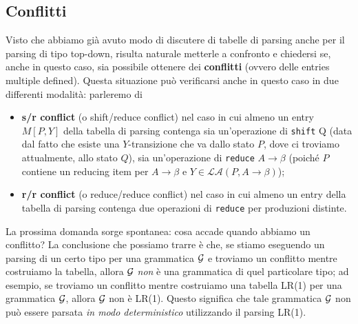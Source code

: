 \documentclass[class=book, crop=false, oneside, 12pt]{standalone}
\begin{document}
\subsection{Conflitti}
Visto che abbiamo già avuto modo di discutere di tabelle di parsing anche per il parsing di tipo top-down, risulta naturale metterle a confronto e chiedersi se, anche in questo caso, sia possibile ottenere dei \textbf{conflitti} (ovvero delle entries multiple defined). Questa situazione può verificarsi anche in questo caso in due differenti modalità: parleremo di
\begin{itemize}
    \item \textbf{s/r conflict} (o shift/reduce conflict) nel caso in cui almeno un entry \(M[P, Y]\) della tabella di parsing contenga sia un'operazione di \texttt{shift} Q (data dal fatto che esiste una \(Y\)-transizione che va dallo stato \(P\), dove ci troviamo attualmente, allo stato \(Q\)), sia un'operazione di \texttt{reduce} \(A \rightarrow \beta\) (poiché \(P\) contiene un reducing item per \(A \rightarrow \beta\) e \(Y \in \mathcal{LA}(P, A \rightarrow \beta)\));
    \item \textbf{r/r conflict} (o reduce/reduce conflict) nel caso in cui almeno un entry della tabella di parsing contenga due operazioni di \texttt{reduce} per produzioni distinte.
\end{itemize}
La prossima domanda sorge spontanea: cosa accade quando abbiamo un conflitto? La conclusione che possiamo trarre è che, se stiamo eseguendo un parsing di un certo tipo per una grammatica \(\mathcal{G}\) e troviamo un conflitto mentre costruiamo la tabella, allora \(\mathcal{G}\) \emph{non} è una grammatica di quel particolare tipo; ad esempio, se troviamo un conflitto mentre costruiamo una tabella LR(1) per una grammatica \(\mathcal{G}\), allora \(\mathcal{G}\) non è LR(1). Questo significa che tale grammatica \(\mathcal{G}\) non può essere parsata \emph{in modo deterministico} utilizzando il parsing LR(1).
\end{document}
